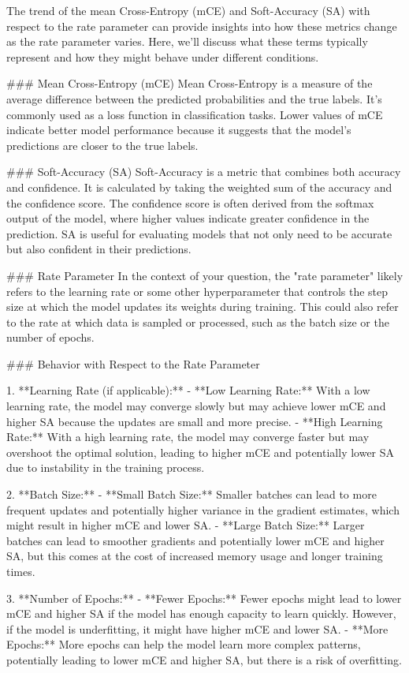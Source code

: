 The trend of the mean Cross-Entropy (mCE) and Soft-Accuracy (SA) with respect to the rate parameter can provide insights into how these metrics change as the rate parameter varies. Here, we'll discuss what these terms typically represent and how they might behave under different conditions.

### Mean Cross-Entropy (mCE)
Mean Cross-Entropy is a measure of the average difference between the predicted probabilities and the true labels. It's commonly used as a loss function in classification tasks. Lower values of mCE indicate better model performance because it suggests that the model's predictions are closer to the true labels.

### Soft-Accuracy (SA)
Soft-Accuracy is a metric that combines both accuracy and confidence. It is calculated by taking the weighted sum of the accuracy and the confidence score. The confidence score is often derived from the softmax output of the model, where higher values indicate greater confidence in the prediction. SA is useful for evaluating models that not only need to be accurate but also confident in their predictions.

### Rate Parameter
In the context of your question, the "rate parameter" likely refers to the learning rate or some other hyperparameter that controls the step size at which the model updates its weights during training. This could also refer to the rate at which data is sampled or processed, such as the batch size or the number of epochs.

### Behavior with Respect to the Rate Parameter

1. **Learning Rate (if applicable):**
   - **Low Learning Rate:** With a low learning rate, the model may converge slowly but may achieve lower mCE and higher SA because the updates are small and more precise.
   - **High Learning Rate:** With a high learning rate, the model may converge faster but may overshoot the optimal solution, leading to higher mCE and potentially lower SA due to instability in the training process.

2. **Batch Size:**
   - **Small Batch Size:** Smaller batches can lead to more frequent updates and potentially higher variance in the gradient estimates, which might result in higher mCE and lower SA.
   - **Large Batch Size:** Larger batches can lead to smoother gradients and potentially lower mCE and higher SA, but this comes at the cost of increased memory usage and longer training times.

3. **Number of Epochs:**
   - **Fewer Epochs:** Fewer epochs might lead to lower mCE and higher SA if the model has enough capacity to learn quickly. However, if the model is underfitting, it might have higher mCE and lower SA.
   - **More Epochs:** More epochs can help the model learn more complex patterns, potentially leading to lower mCE and higher SA, but there is a risk of overfitting.

